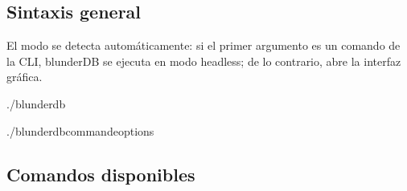 \documentclass[letterpaper,10pt,spanish]{sphinxmanual}
\begin{document}
\subsection{Sintaxis general}
\label{\detokenize{cli:syntaxe-generale}}
\sphinxAtStartPar
El modo se detecta automáticamente: si el primer argumento es un comando de la CLI, blunderDB se ejecuta en modo headless; de lo contrario, abre la interfaz gráfica.

\begin{sphinxVerbatim}[commandchars=\\\{\}]
./blunderdb

./blunderdb\PYGZlt{}commande\PYGZgt{}\PYG{o}{[}options\PYG{o}{]}
\end{sphinxVerbatim}


\subsection{Comandos disponibles}
\label{\detokenize{cli:commandes-disponibles}}
\end{document}
